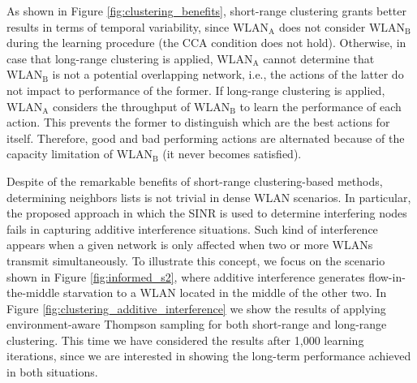\documentclass{article}
\begin{document}
As shown in Figure \ref{fig:clustering_benefits}, short-range clustering grants better results in terms of temporal variability, since $\text{WLAN}_\text{A}$ does not consider $\text{WLAN}_\text{B}$ during the learning procedure (the CCA condition does not hold). Otherwise, in case that long-range clustering is applied, $\text{WLAN}_\text{A}$ cannot determine that $\text{WLAN}_\text{B}$ is not a potential overlapping network, i.e., the actions of the latter do not impact to performance of the former. If long-range clustering is applied, $\text{WLAN}_\text{A}$ considers the throughput of $\text{WLAN}_\text{B}$ to learn the performance of each action. This prevents the former to distinguish which are the best actions for itself. Therefore, good and bad performing actions are alternated because of the capacity limitation of $\text{WLAN}_\text{B}$ (it never becomes satisfied).

Despite of the remarkable benefits of short-range clustering-based methods, determining neighbors lists is not trivial in dense WLAN scenarios. In particular, the proposed approach in which the SINR is used to determine interfering nodes fails in capturing additive interference situations. Such kind of interference appears when a given network is only affected when two or more WLANs transmit simultaneously. To illustrate this concept, we focus on the scenario shown in Figure \ref{fig:informed_s2}, where additive interference generates flow-in-the-middle starvation to a WLAN located in the middle of the other two. In Figure \ref{fig:clustering_additive_interference} we show the results of applying environment-aware Thompson sampling for both short-range and long-range clustering. This time we have considered the results after 1,000 learning iterations, since we are interested in showing the long-term performance achieved in both situations.
\end{document}

